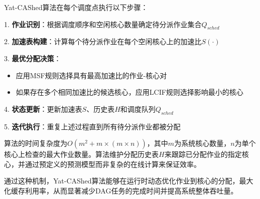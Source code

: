 \documentclass[12pt]{article}
\begin{document}
Yat-CAShed算法在每个调度点执行以下步骤：

1. \textbf{作业识别}：根据调度顺序和空闲核心数量确定待分派作业集合$Q_{sched}$

2. \textbf{加速表构建}：计算每个待分派作业在每个空闲核心上的加速比$S(\cdot)$

3. \textbf{最优分配决策}：
   \begin{itemize}
       \item 应用MSF规则选择具有最高加速比的作业-核心对
       \item 如果存在多个相同加速比的候选核心，应用LCIF规则选择影响最小的核心
   \end{itemize}

4. \textbf{状态更新}：更新加速表$S$、历史表$H$和调度队列$Q_{sched}$

5. \textbf{迭代执行}：重复上述过程直到所有待分派作业都被分配

算法的时间复杂度为$O(m^2 + m \times (m \times n))$，其中$m$为系统核心数量，$n$为单个核心上检查的最大作业数量。算法维护分配历史表$H$来跟踪已分配作业的指定核心，并通过预定义的预测模型而非复杂的在线计算来保证效率。

通过这种机制，Yat-CAShed算法能够在运行时动态优化作业到核心的分配，最大化缓存利用率，从而显著减少DAG任务的完成时间并提高系统整体吞吐量。
\end{document}
